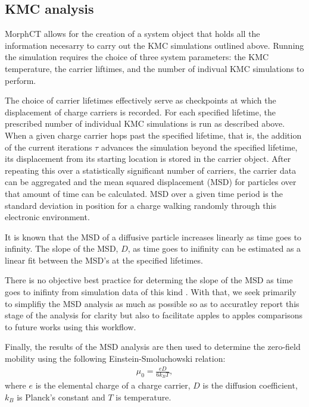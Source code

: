 \subsection{KMC analysis}

MorphCT allows for the creation of a system object that holds all the information necesarry to carry out the
KMC simulations outlined above. Running the simulation requires the choice of three system parameters: the
KMC temperature, the carrier liftimes, and the number of indivual KMC simulations to perform.

The choice of carrier lifetimes effectively serve as checkpoints at which the displacement of charge carriers is recorded. For
each specified lifetime, the prescribed number of individual KMC simulations is run as described above. When a
given charge carrier hops past the specified lifetime, that is, the addition of the current iterations $\tau$ advances
the simulation beyond the specified lifetime, 
its displacement from its starting location is stored in the carrier object. After repeating this over a
statistically significant number of carriers, the carrier data can be aggregated and the mean squared
displacement (MSD) for particles over that amount of time can be calculated. MSD over a given time period is 
the standard deviation in position for a charge walking randomly through this electronic environment. 

It is known that the MSD of a diffusive particle increases linearly as time goes to infinity. 
The slope of the MSD, $D$, as time
goes to inifinity can be estimated as a linear fit between the MSD's at the specified lifetimes.

There is no objective best practice for determing the slope of the MSD as
time goes to inifinty from simulation data of this kind \cite{Maginn2018}. With that, we seek primarily to simplifiy the MSD analysis as much as
possible so as to accuratley report this stage of the analysis for clarity but also to facilitate apples to
apples comparisons to future works using this workflow. 

Finally, the results of the MSD analysis are then used to determine the zero-field mobility using the following Einstein-Smoluchowski relation:
\begin{align}
    \label{einstein}
    \mu_{0} = \frac{eD}{6k_{B}T},
\end{align}
where $e$ is the elemental charge of a charge carrier, $D$ is the diffusion coefficient, $k_{B}$ is Planck's
constant and $T$ is temperature. 

